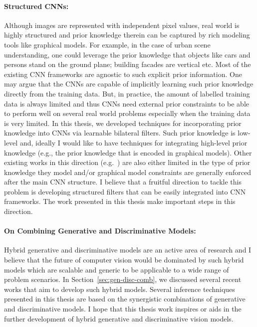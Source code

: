 \paragraph{Structured CNNs:} A​lthough images are represented with independent pixel values,
real­ world is highly structured and prior knowledge therein can be captured by rich
modeling tools like graphical models. For example, in the case of urban scene
understanding, one could leverage the prior knowledge that objects like cars and persons
stand on the ground plane; building facades are vertical etc. Most of the existing CNN
frameworks are agnostic to such explicit prior information. One may argue that the CNNs
are capable of implicitly learning such prior knowledge directly from the training data.
But, in practice, the amount of labelled training data is always limited and thus CNNs
need external prior constraints to be able to perform well on several real­ world problems
especially when the training data is very limited. In this thesis, we developed techniques
for incorporating prior knowledge into CNNs via learnable bilateral filters. Such prior
knowledge is low-level and, ideally I would like to have techniques for integrating
high-level prior knowledge (e.g., the prior knowledge that is encoded in
graphical models). Other existing works in this direction
(e.g.~\cite{jain2015structural,zheng2015conditional,tompson2014joint,chandra2016fast})
are also either limited in the type of prior knowledge they model and/or graphical
model constraints are generally enforced after the main CNN structure.
I believe that a fruitful direction to tackle this problem is developing structured
filters that can be easily integrated into CNN frameworks. The work presented in
this thesis make important steps in this direction.

\vspace{-0.2cm}
\paragraph{On Combining Generative and Discriminative Models:} Hybrid generative
and discriminative models are an active area of research and I believe that the
future of computer vision would be dominated by such hybrid models which are
scalable and generic to be applicable to a wide range of problem scenarios.
In Section~\ref{sec:gen-disc-comb}, we discussed several recent works that aim
to develop such hybrid models. Several inference techniques presented in this
thesis are based on the synergistic combinations of generative and discriminative
models. I hope that this thesis work inspires or aids in the further development
of hybrid generative and discriminative vision models.
